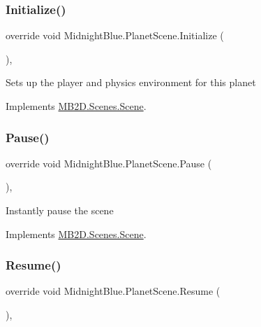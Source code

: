 \subsubsection{\texorpdfstring{Initialize()}{Initialize()}}
{\footnotesize\ttfamily override void Midnight\+Blue.\+Planet\+Scene.\+Initialize (\begin{DoxyParamCaption}{ }\end{DoxyParamCaption})\hspace{0.3cm}{\ttfamily [inline]}, {\ttfamily [virtual]}}



Sets up the player and physics environment for this planet 



Implements \hyperlink{class_m_b2_d_1_1_scenes_1_1_scene_a081b4f8866936b495bdce388a7c96c25}{M\+B2\+D.\+Scenes.\+Scene}.

\hypertarget{class_midnight_blue_1_1_planet_scene_abc077e1cd5f40879ca3af4224f0ff455}{}\label{class_midnight_blue_1_1_planet_scene_abc077e1cd5f40879ca3af4224f0ff455} 
\subsubsection{\texorpdfstring{Pause()}{Pause()}}
{\footnotesize\ttfamily override void Midnight\+Blue.\+Planet\+Scene.\+Pause (\begin{DoxyParamCaption}{ }\end{DoxyParamCaption})\hspace{0.3cm}{\ttfamily [inline]}, {\ttfamily [virtual]}}



Instantly pause the scene 



Implements \hyperlink{class_m_b2_d_1_1_scenes_1_1_scene_a0661eff0223150fa8e9ea88145409e5d}{M\+B2\+D.\+Scenes.\+Scene}.

\hypertarget{class_midnight_blue_1_1_planet_scene_aa14750d3675b59462796e821b3921397}{}\label{class_midnight_blue_1_1_planet_scene_aa14750d3675b59462796e821b3921397} 
\subsubsection{\texorpdfstring{Resume()}{Resume()}}
{\footnotesize\ttfamily override void Midnight\+Blue.\+Planet\+Scene.\+Resume (\begin{DoxyParamCaption}{ }\end{DoxyParamCaption})\hspace{0.3cm}{\ttfamily [inline]}, {\ttfamily [virtual]}}



